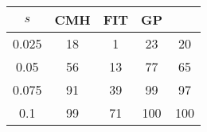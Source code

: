 \centering \begin{tabular}{c|c|c|c|c}
$s$	&CMH	&FIT	&GP	&\sc{Clear}\\\hline
0.025	&18	&1	&23	&20\\
0.05	&56	&13	&77	&65\\
0.075	&91	&39	&99	&97\\
0.1	&99	&71	&100	&100\\
\end{tabular}
